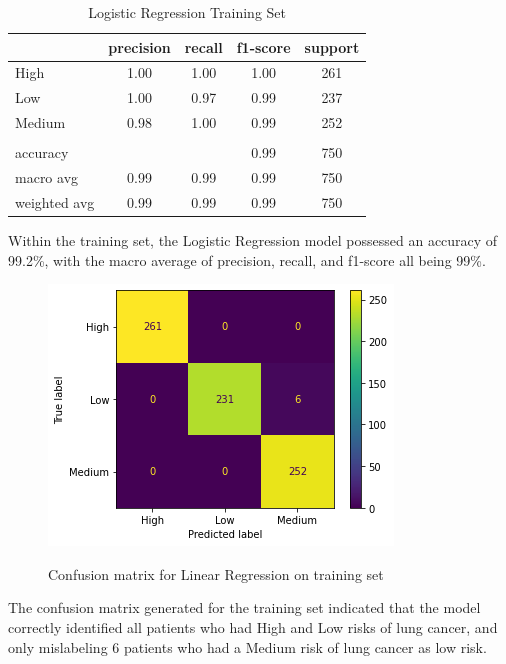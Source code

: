 \documentclass[runningheads]{llncs}
\begin{document}
\begin{table}[ht]
\centering
\caption{Logistic Regression Training Set}
\begin{tabular}{|l|c|c|c|c|} \hline
 & precision & recall & f1-score & support \\ \hline
High   & 1.00 & 1.00 & 1.00 & 261 \\ \hline
Low    & 1.00 & 0.97 & 0.99 & 237 \\ \hline
Medium & 0.98 & 1.00 & 0.99 & 252 \\ \hline
& & & & \\ \hline
accuracy     & & & 0.99 & 750 \\ \hline
macro avg    & 0.99 & 0.99 & 0.99 & 750 \\ \hline
weighted avg & 0.99 & 0.99 & 0.99 & 750 \\ \hline
\end{tabular}
\label{tab:regression-training}
\end{table}

Within the training set, the Logistic Regression model possessed an accuracy of 99.2\%, with the macro average of precision, recall, and f1-score all being 99\%. 

\begin{figure}[H]           	 
\centering               	 
\caption{Confusion matrix for Linear Regression on training set}
\includegraphics[scale=0.5]{regression-CM-training.png}  	 
\label{fig:regression-CM-training}
\end{figure}

The confusion matrix generated for the training set indicated that the model correctly identified all patients who had High and Low risks of lung cancer, and only mislabeling 6 patients who had a Medium risk of lung cancer as low risk.
\newpage
\end{document}
